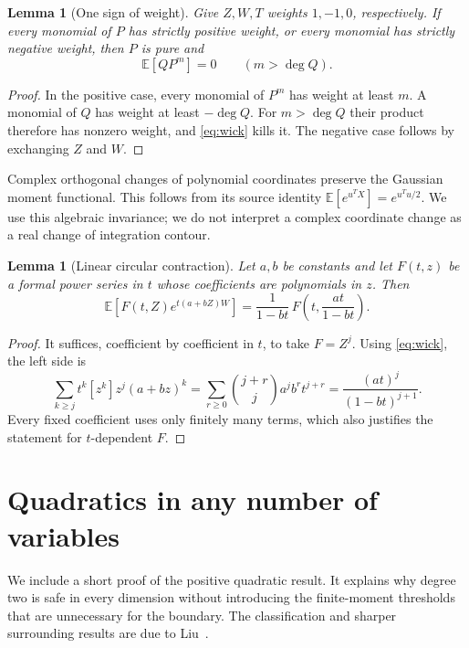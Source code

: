 \documentclass[11pt]{article}
\newtheorem{lemma}[theorem]{Lemma}
\theoremstyle{definition}\newtheorem{definition}[theorem]{Definition}
\theoremstyle{remark}\newtheorem{remark}[theorem]{Remark}
\newcommand{\E}{\mathbb E}
\begin{document}
\begin{lemma}[One sign of weight]\label{lem:weight}
Give $Z,W,T$ weights $1,-1,0$, respectively. If every monomial of $P$
has strictly positive weight, or every monomial has strictly negative
weight, then $P$ is pure and
\[
 \E[QP^m]=0\qquad(m>\deg Q).
\]
\end{lemma}
\begin{proof}
In the positive case, every monomial of $P^m$ has weight at least $m$.
A monomial of $Q$ has weight at least $-\deg Q$. For $m>\deg Q$ their
product therefore has nonzero weight, and \eqref{eq:wick} kills it.
The negative case follows by exchanging $Z$ and $W$.
\end{proof}

Complex orthogonal changes of polynomial coordinates preserve the
Gaussian moment functional. This follows from its source identity
$\E[e^{u^TX}]=e^{u^Tu/2}$. We use this algebraic invariance; we do not
interpret a complex coordinate change as a real change of integration
contour.

\begin{lemma}[Linear circular contraction]\label{lem:contraction}
Let $a,b$ be constants and let $F(t,z)$ be a formal power series in $t$
whose coefficients are polynomials in $z$. Then
\begin{equation}\label{eq:contraction}
 \E\!\left[F(t,Z)e^{t(a+bZ)W}\right]
   =\frac{1}{1-bt}\,
       F\!\left(t,\frac{at}{1-bt}\right).
\end{equation}
\end{lemma}
\begin{proof}
It suffices, coefficient by coefficient in $t$, to take $F=Z^j$.
Using \eqref{eq:wick}, the left side is
\[
 \sum_{k\geq j}t^k[z^k]z^j(a+bz)^k
 =\sum_{r\geq0}\binom{j+r}{j}a^j b^r t^{j+r}
 =\frac{(at)^j}{(1-bt)^{j+1}}.
\]
Every fixed coefficient uses only finitely many terms, which also
justifies the statement for $t$-dependent $F$.
\end{proof}

\section{Quadratics in any number of variables}\label{sec:quadratics}

We include a short proof of the positive quadratic result. It explains
why degree two is safe in every dimension without introducing the
finite-moment thresholds that are unnecessary for the boundary.
The classification and sharper surrounding results are due to
Liu~\cite[Theorem~2.1]{Liu}.
\end{document}
